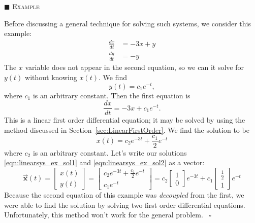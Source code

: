 \documentclass[reqno]{immbook}
\newcommand{\BX}{\vec{\textbf{x}}}
\numberwithin{equation}{chapter}
\numberwithin{question}{section}
\numberwithin{theorem}{chapter}
\numberwithin{figure}{chapter}
\theoremstyle{definition}
\newenvironment{xexample}%
{%

\medskip\noindent\addtocounter{example}{1}$\blacksquare$ \textsc{Example \theexample}\hspace*{1em}%
}%
{%
~\hfill$\square$

\medskip
}
\begin{document}
\begin{xexample}
Before discussing a general technique for
solving such systems, we consider this example:
\begin{equation}
\begin{split}
  \frac{dx}{dt} & = -3x + y \\
  \frac{dy}{dt} & = -y
\end{split}
\label{eqn:linearsys_ex}
\end{equation}
The $x$ variable does not appear in the second equation,
so we can it solve for $y(t)$ without knowing $x(t)$. We find
\begin{equation}
y(t) = c_1 e^{-t},
\label{eqn:linearsys_ex_sol1}
\end{equation}
where $c_1$ is an arbitrary constant.
Then the first equation is
\begin{equation}
  \frac{dx}{dt} = -3x + c_1 e^{-t}.
\end{equation}
This is a linear first order differential equation; it may be
solved by using the method discussed in Section~\ref{sec:LinearFirstOrder}.
We find the solution to be
\begin{equation}
   x(t) = c_2 e^{-3t} + \frac{c_1}{2}e^{-t}
\label{eqn:linearsys_ex_sol2}
\end{equation}
where $c_2$ is an arbitrary constant.
Let's write our solutions \eqref{eqn:linearsys_ex_sol1}
and \eqref{eqn:linearsys_ex_sol2} as a vector:
\begin{equation}
  \BX(t) = \begin{bmatrix}
                x(t) \\ y(t)
           \end{bmatrix}
         =
           \begin{bmatrix}
               c_2 e^{-3t} + \frac{c_1}{2} e^{-t} \\
               c_1 e^{-t}
           \end{bmatrix}
         =
           c_2 \begin{bmatrix}
               1 \\ 0
           \end{bmatrix} e^{-3t}
           + c_1 \begin{bmatrix}
               \frac{1}{2} \\
               1
           \end{bmatrix} e^{-t}
\label{eqn:linearsys_ex_vecsol}
\end{equation}
Because the second equation of this example was
\emph{decoupled} from the first, we were able to
find the solution by solving two first order differential equations.
Unfortunately, this method won't work for the general problem.
\end{xexample}
\end{document}
